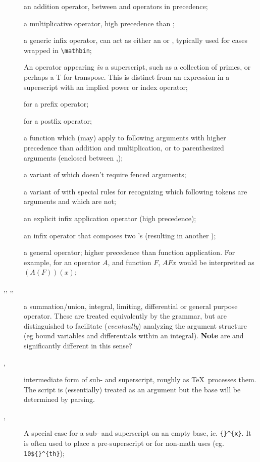 \documentclass{book}
\begin{document}
\begin{description}
\item[] an addition operator, between  and  operators in
   precedence;
\item[] a multiplicative operator, high precedence than ;
\item[] a generic infix operator, can act as either an  or ,
   typically used for cases wrapped in \verb|\mathbin|;
\item[] An operator appearing \emph{in} a superscript, such as a collection of primes,
  or perhaps a T for transpose. This is distinct from an expression in a superscript with
  an implied power or index operator;

\item[] for a prefix operator;
\item[] for a postfix operator;

\item[] a function which (may) apply to following arguments with higher
   precedence than addition and multiplication, or to parenthesized arguments
   (enclosed between ,);
\item[] a variant of  which doesn't require fenced arguments;
\item[] a variant of  with special rules for
  recognizing which following tokens are arguments and which are not;
\item[] an explicit infix application operator (high precedence);
\item[] an infix operator that composes two 's
  (resulting in another );
\item[] a general operator; higher precedence than function application.
  For example, for an operator $A$, and function $F$, $A F x$ would be interpretted as $(A(F))(x)$;
\item[,, ,,]
  a summation/union, integral, limiting, differential or general purpose operator.
  These are treated equivalently by the grammar, but are distinguished to
 facilitate (\emph{eventually}) analyzing the argument structure (eg bound variables
  and differentials within an integral).
 \textbf{Note} are  and  significantly different in this sense?

\item[,] intermediate form of
  sub- and superscript, roughly as \TeX\ processes them.  The script is (essentially)
  treated as an argument but the base will be determined by parsing. 
\item[,] A special case for a sub- and
 superscript on an empty base, ie. \verb|{}^{x}|.  It is often used to place
  a pre-superscript or for non-math uses (eg. \verb|10${}^{th}|);
\end{description}
\end{document}
